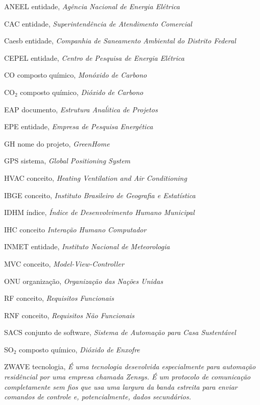 \begin{siglas}
  \item[ANEEL] entidade, \textit{Agência Nacional de Energia Elétrica}
  \item[CAC] entidade, \textit{Superintendência de Atendimento Comercial}
  \item[Caesb] entidade, \textit{Companhia de Saneamento Ambiental do Distrito Federal}
  \item[CEPEL] entidade, \textit{Centro de Pesquisa de Energia Elétrica}
  \item[CO] composto químico, \textit{Monóxido de Carbono}
  \item[CO$_2$] composto químico, \textit{Dióxido de Carbono}
  \item[EAP] documento, \textit{Estrutura Ana\'litica de Projetos}
  \item[EPE] entidade, \textit{Empresa de Pesquisa Energética}
  \item[GH] nome do projeto, \textit{GreenHome}
  \item[GPS] sistema, \textit{Global Positioning System}
  \item[HVAC] conceito, \textit{Heating Ventilation and Air Conditioning}
  \item[IBGE] conceito, \textit{Instituto Brasileiro de Geografia e Estatística}
  \item[IDHM] índice, \textit{Índice de Desenvolvimento Humano Municipal}
  \item[IHC] conceito \textit{Interação Humano Computador}
  \item[INMET] entidade, \textit{Instituto Nacional de Meteorologia}
  \item[MVC] conceito, \textit{Model-View-Controller}
  \item[ONU] organização, \textit{Organização das Nações Unidas}
  \item[RF] conceito, \textit{Requisitos Funcionais}
  \item[RNF] conceito, \textit{Requisitos Não Funcionais}
  \item[SACS] conjunto de software, \textit{Sistema de Automação para Casa Sustentável}
  \item[SO$_2$] composto químico, \textit{Dióxido de Enxofre}
  \item[ZWAVE] tecnologia, \textit{É uma tecnologia desevolvida especialmente para automação residêncial por uma empresa chamada Zensys. É um protocolo de comunicação completamente sem fios que usa uma largura da banda estreita para enviar comandos de controle e, potencialmente, dados secundários.}
\end{siglas}
